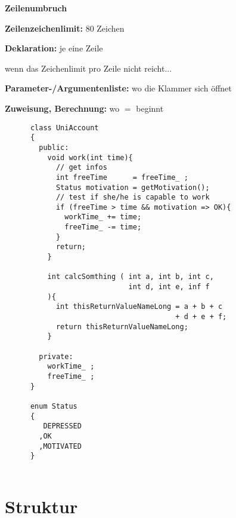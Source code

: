 \documentclass[
   draft=false
  ,paper=a4
  ,twoside=false
  ,fontsize=11pt
  ,headsepline
  ,DIV=11
  ,parskip=full+
  ,titlepage
]{scrartcl} %
\begin{document}
\begin{minipage}[t]{0.45\linewidth}
  \large{\textbf{Zeilenumbruch}}\normalsize 
  \begin{compactitem}
    \item[\textbf{Zeilenzeichenlimit:}] 80 Zeichen
    \item[\textbf{Deklaration:}] je eine Zeile
    \item wenn das Zeichenlimit pro Zeile nicht reicht...
    \begin{compactitem}
      \item \textbf{Parameter-/Argumentenliste:} wo die Klammer sich öffnet
      \item \textbf{Zuweisung, Berechnung:} wo $=$ beginnt
    \end{compactitem}
  \end{compactitem}
  \end{minipage}%
  \hfill
  \begin{minipage}[t]{0.5\linewidth}
    \begin{lstlisting}
      class UniAccount
      {
        public:
          void work(int time){
            // get infos 
            int freeTime      = freeTime_ ;
            Status motivation = getMotivation();
            // test if she/he is capable to work
            if (freeTime > time && motivation => OK){
              workTime_ += time;
              freeTime_ -= time;
            }
            return;
          }
        
          int calcSomthing ( int a, int b, int c, 
                             int d, int e, inf f 
          ){
            int thisReturnValueNameLong = a + b + c 
                                        + d + e + f;
            return thisReturnValueNameLong;    
          }
        
        private:
          workTime_ ;
          freeTime_ ;
      }
      
      enum Status
      {
         DEPRESSED
        ,OK
        ,MOTIVATED
      } 
      
    \end{lstlisting}    
  \end{minipage}%

\section{Struktur}
\end{document}
